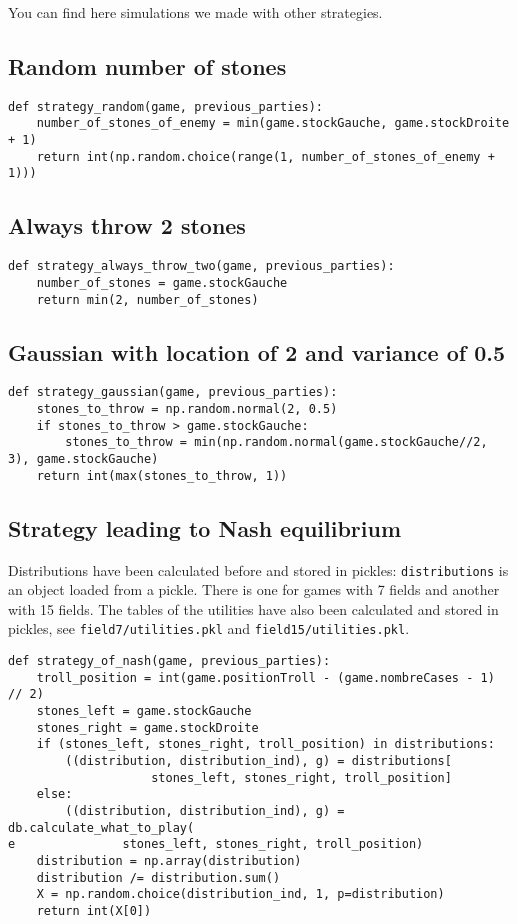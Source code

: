 \documentclass{article}%
\begin{document}
You can find here simulations we made with other strategies. 

\subsection{Random number of stones}

\begin{verbatim}
def strategy_random(game, previous_parties):
	number_of_stones_of_enemy = min(game.stockGauche, game.stockDroite + 1)
	return int(np.random.choice(range(1, number_of_stones_of_enemy + 1)))
\end{verbatim}

\subsection{Always throw 2 stones}

\begin{verbatim}
def strategy_always_throw_two(game, previous_parties):
	number_of_stones = game.stockGauche
	return min(2, number_of_stones)
\end{verbatim}

\subsection{Gaussian with location of 2 and variance of 0.5}

\begin{verbatim}
def strategy_gaussian(game, previous_parties):
	stones_to_throw = np.random.normal(2, 0.5)
	if stones_to_throw > game.stockGauche:
		stones_to_throw = min(np.random.normal(game.stockGauche//2, 3), game.stockGauche)
	return int(max(stones_to_throw, 1))
\end{verbatim}

\subsection{Strategy leading to Nash equilibrium}

Distributions have been calculated before and stored in pickles: \texttt{distributions} is an object loaded from a pickle. There is one for games with 7 fields and another with 15 fields. The tables of the utilities have also been calculated and stored in pickles, see \texttt{field7/utilities.pkl} and \texttt{field15/utilities.pkl}.

\begin{verbatim}
def strategy_of_nash(game, previous_parties):
	troll_position = int(game.positionTroll - (game.nombreCases - 1) // 2)
	stones_left = game.stockGauche
	stones_right = game.stockDroite
	if (stones_left, stones_right, troll_position) in distributions:
		((distribution, distribution_ind), g) = distributions[
					stones_left, stones_right, troll_position]
	else:
		((distribution, distribution_ind), g) = db.calculate_what_to_play(
e				stones_left, stones_right, troll_position)
	distribution = np.array(distribution)
	distribution /= distribution.sum()
	X = np.random.choice(distribution_ind, 1, p=distribution)
	return int(X[0])
\end{verbatim}
\end{document}
